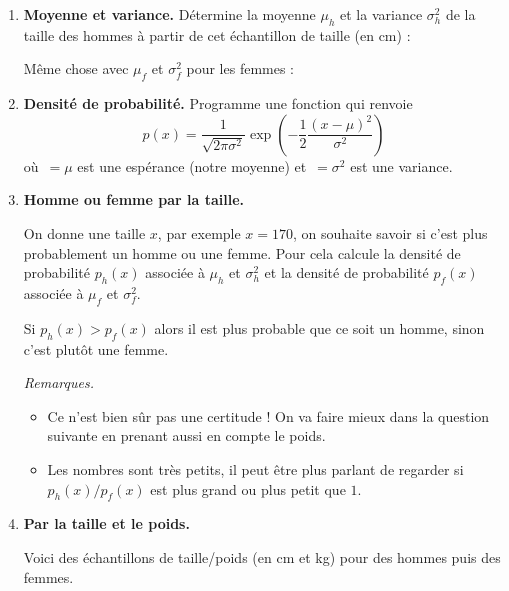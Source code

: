 \documentclass[11pt,class=report,crop=false]{standalone}
\begin{document}
\begin{activite}
	

\begin{enumerate}
	\item \textbf{Moyenne et variance.}
	Détermine la moyenne $\mu_h$ et la variance $\sigma^2_h$ de la taille des hommes à partir de cet échantillon de taille (en cm) :	
	
	Même chose avec $\mu_f$ et $\sigma^2_f$ pour les femmes :	
	
	\item \textbf{Densité de probabilité.}
	Programme une fonction  qui renvoie
	$$p(x) = \frac{1}{\sqrt{2\pi\sigma^2}} \exp\left( -\frac12 \frac{(x-\mu)^2}{\sigma^2} \right)$$
	où \,$=\mu$ est une espérance (notre moyenne) et \,$=\sigma^2$ est une variance.
	

	\item \textbf{Homme ou femme par la taille.}
	
	On donne une taille $x$, par exemple $x=170$, on souhaite savoir si c'est plus probablement un homme ou une femme. 
	Pour cela calcule la densité de probabilité $p_h(x)$ associée à $\mu_h$ et $\sigma^2_h$ et la densité de probabilité $p_f(x)$ associée à $\mu_f$ et $\sigma^2_f$.
	
	Si $p_h(x)>p_f(x)$ alors il est plus probable que ce soit un homme, sinon c'est plutôt une femme. 
	
	\emph{Remarques.}
	\begin{itemize}
		\item Ce n'est bien sûr pas une certitude ! On va faire mieux dans la question suivante en prenant aussi en compte le poids.
		\item Les nombres sont très petits, il peut être plus parlant de regarder si
		$p_h(x)/p_f(x)$ est plus grand ou plus petit que $1$.
	\end{itemize}


	\item \textbf{Par la taille et le poids.}
	
	Voici des échantillons de taille/poids (en cm et kg) pour des hommes puis des femmes.
	

\end{enumerate}
\end{activite}
\end{document}
